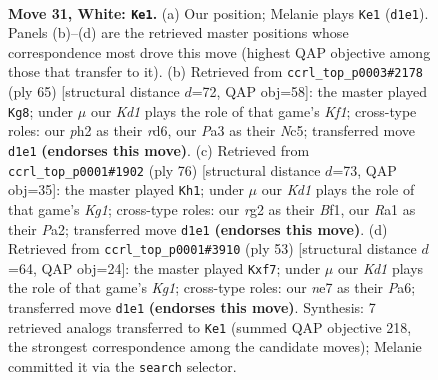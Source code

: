 \documentclass[11pt]{article}
\begin{document}
\clearpage

\begin{figure}[p]\centering
\begin{subfigure}{0.46\textwidth}\centering
\resizebox{\linewidth}{!}{%
\newchessgame
\chessboard[
  setfen={1Qb2k2/4n3/8/4Pp2/p7/P7/2q3rp/R2K3R w - - 0 31},
  showmover=false,
  pgfstyle=straightmove, color=movearrow, markmove={d1-e1}
]}
\caption{}
\end{subfigure}\hfill
\begin{subfigure}{0.46\textwidth}\centering
\resizebox{\linewidth}{!}{%
\newchessgame
\chessboard[
  setfen={4rk2/8/1p1R3Q/2n1n3/p7/6P1/P6P/1qB3K1 b - - 3 33},
  showmover=false,
  pgfstyle=straightmove, color=movearrow, markmove={f8-g8}
]}
\caption{}
\end{subfigure}
\\[4pt]
\begin{subfigure}{0.46\textwidth}\centering
\resizebox{\linewidth}{!}{%
\newchessgame
\chessboard[
  setfen={8/p5rk/2PQ4/3n1p2/3q1P2/4p3/P3R3/5BK1 w - - 1 39},
  showmover=false,
  pgfstyle=straightmove, color=movearrow, markmove={g1-h1}
]}
\caption{}
\end{subfigure}\hfill
\begin{subfigure}{0.46\textwidth}\centering
\resizebox{\linewidth}{!}{%
\newchessgame
\chessboard[
  setfen={r5k1/5Rp1/p2P3r/7p/3Q4/7P/PP1B1P1K/3q4 b - - 0 27},
  showmover=false,
  pgfstyle=straightmove, color=movearrow, markmove={g8-f7}
]}
\caption{}
\end{subfigure}
\caption{\textbf{Move 31, White: \texttt{Ke1}.} (a) Our position; Melanie plays \texttt{Ke1} (\texttt{d1e1}). Panels (b)--(d) are the retrieved master positions whose correspondence most drove this move (highest QAP objective among those that transfer to it). (b) Retrieved from \texttt{ccrl\_top\_p0003\#2178} (ply 65) [structural distance $d$=72, QAP obj=58]: the master played \texttt{Kg8}; under $\mu$ our \emph{Kd1} plays the role of that game's \emph{Kf1}; cross-type roles: our \emph{p}h2 as their \emph{r}d6, our \emph{P}a3 as their \emph{N}c5; transferred move \texttt{d1e1} \textbf{(endorses this move)}. (c) Retrieved from \texttt{ccrl\_top\_p0001\#1902} (ply 76) [structural distance $d$=73, QAP obj=35]: the master played \texttt{Kh1}; under $\mu$ our \emph{Kd1} plays the role of that game's \emph{Kg1}; cross-type roles: our \emph{r}g2 as their \emph{B}f1, our \emph{R}a1 as their \emph{P}a2; transferred move \texttt{d1e1} \textbf{(endorses this move)}. (d) Retrieved from \texttt{ccrl\_top\_p0001\#3910} (ply 53) [structural distance $d$=64, QAP obj=24]: the master played \texttt{Kxf7}; under $\mu$ our \emph{Kd1} plays the role of that game's \emph{Kg1}; cross-type roles: our \emph{n}e7 as their \emph{P}a6; transferred move \texttt{d1e1} \textbf{(endorses this move)}. Synthesis: 7 retrieved analogs transferred to \texttt{Ke1} (summed QAP objective 218, the strongest correspondence among the candidate moves); Melanie committed it via the \texttt{search} selector.}
\label{fig:thought-m60}
\end{figure}
\end{document}
